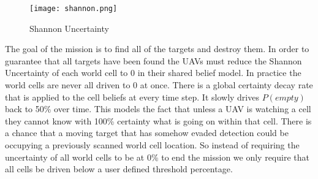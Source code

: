 \begin{multicols*}{2}
	
	\begin{figure}[H]
		\centering
		\texttt{[image: shannon.png]}
		\caption{Shannon Uncertainty}
		\label{fig:shannon}
	\end{figure}
	
The goal of the mission is to find all of the targets and destroy them.  In order to guarantee that all targets have been found the UAVs must reduce the Shannon Uncertainty of each world cell to 0 in their shared belief model.  In practice the world cells are never all driven to 0 at once.  There is a global certainty decay rate that is applied to the cell beliefs at every time step.  It slowly drives $P(empty)$ back to 50\% over time.  This models the fact that unless a UAV is watching a cell they cannot know with 100\% certainty what is going on within that cell.  There is a chance that a moving target that has somehow evaded detection could be occupying a previously scanned world cell location.  So instead of requiring the uncertainty of all world cells to be at 0\% to end the mission we only require that all cells be driven below a user defined threshold percentage.




\end{multicols*}
